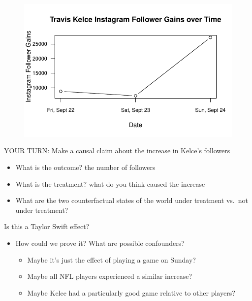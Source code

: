 \documentclass[
  letterpaper,
  DIV=11,
  numbers=noendperiod]{scrreprt}
\providecommand{\tightlist}{%
  \setlength{\itemsep}{0pt}\setlength{\parskip}{0pt}}\usepackage{longtable,booktabs,array}
\begin{document}
\begin{figure}[H]

{\centering \includegraphics{05-Causalityii_files/figure-pdf/unnamed-chunk-3-1.pdf}

}

\end{figure}

YOUR TURN: Make a causal claim about the increase in Kelce's followers

\begin{itemize}
\tightlist
\item
  What is the outcome? the number of followers
\item
  What is the treatment? what do you think caused the increase
\item
  What are the two counterfactual states of the world under treatment
  vs.~not under treatment?
\end{itemize}

Is this a Taylor Swift effect?

\begin{itemize}
\tightlist
\item
  How could we prove it? What are possible confounders?

  \begin{itemize}
  \tightlist
  \item
    Maybe it's just the effect of playing a game on Sunday?
  \item
    Maybe all NFL players experienced a similar increase?
  \item
    Maybe Kelce had a particularly good game relative to other players?
  \end{itemize}
\end{itemize}
\end{document}
